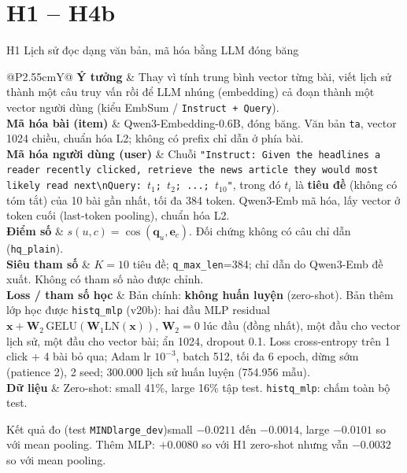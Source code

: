 \documentclass[aspectratio=169,t]{beamer}
\makeatletter
\newcommand{\code}[1]{\texttt{#1}}
\newcommand{\bangmota}[1]{{\scriptsize\renewcommand{\arraystretch}{1.1}\setlength{\tabcolsep}{4pt}%
  \begin{tabularx}{\textwidth}{@{}P{2.55cm}Y@{}}\toprule #1 \bottomrule\end{tabularx}}}
\newcommand{\rw}[2]{\textbf{#1} & #2\\ \midrule}
\newcommand{\rwl}[2]{\textbf{#1} & #2\\}
\newcommand{\ketqua}[1]{\begin{exampleblock}{Kết quả đo (test \code{MINDlarge\_dev})}\scriptsize #1\end{exampleblock}}
\makeatother
\begin{document}
\section{H1 -- H4b}
\begin{frame}[shrink]{H1 \textperiodcentered{} Lịch sử đọc dạng văn bản, mã hóa bằng LLM đóng băng}
\bangmota{
\rw{Ý tưởng}{Thay vì tính trung bình vector từng bài, viết lịch sử thành một câu truy vấn rồi để LLM nhúng (embedding) cả đoạn thành một vector người dùng (kiểu EmbSum / \code{Instruct + Query}).}
\rw{Mã hóa bài (item)}{Qwen3-Embedding-0.6B, đóng băng. Văn bản \code{ta}, vector 1024 chiều, chuẩn hóa L2; không có prefix chỉ dẫn ở phía bài.}
\rw{Mã hóa người dùng (user)}{Chuỗi \code{"Instruct: Given the headlines a reader recently clicked, retrieve the news article they would most likely read next\textbackslash nQuery: }$t_1$\code{; }$t_2$\code{; ...; }$t_{10}$\code{"}, trong đó $t_i$ là \textbf{tiêu đề} (không có tóm tắt) của 10 bài gần nhất, tối đa 384 token. Qwen3-Emb mã hóa, lấy vector ở token cuối (last-token pooling), chuẩn hóa L2.}
\rw{Điểm số}{$s(u,c)=\cos(\mathbf q_u,\mathbf e_c)$. Đối chứng không có câu chỉ dẫn (\code{hq\_plain}).}
\rw{Siêu tham số}{$K=10$ tiêu đề; \code{q\_max\_len}=384; chỉ dẫn do Qwen3-Emb đề xuất. Không có tham số nào được chỉnh.}
\rw{Loss / tham số học}{Bản chính: \textbf{không huấn luyện} (zero-shot). Bản thêm lớp học được \code{histq\_mlp} (v20b): hai đầu MLP residual $\mathbf x+\mathbf W_2\,\mathrm{GELU}(\mathbf W_1\mathrm{LN}(\mathbf x))$, $\mathbf W_2=0$ lúc đầu (đồng nhất), một đầu cho vector lịch sử, một đầu cho vector bài; ẩn 1024, dropout 0.1. Loss cross-entropy trên 1 click + 4 bài bỏ qua; Adam lr $10^{-3}$, batch 512, tối đa 6 epoch, dừng sớm (patience 2), 2 seed; 300.000 lịch sử huấn luyện (754.956 mẫu).}
\rwl{Dữ liệu}{Zero-shot: small 41\%, large 16\% tập test. \code{histq\_mlp}: chấm toàn bộ test.}
}
\ketqua{small $-0.0211$ đến $-0.0014$, large $-0.0101$ so với mean pooling. Thêm MLP: $+0.0080$ so với H1 zero-shot nhưng vẫn $-0.0032$ so với mean pooling.}
\par\kern0pt
\end{frame}
\end{document}
